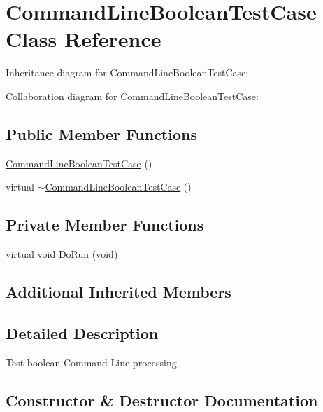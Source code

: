 \hypertarget{classCommandLineBooleanTestCase}{}\section{Command\+Line\+Boolean\+Test\+Case Class Reference}
\label{classCommandLineBooleanTestCase}


Inheritance diagram for Command\+Line\+Boolean\+Test\+Case\+:


Collaboration diagram for Command\+Line\+Boolean\+Test\+Case\+:
\subsection*{Public Member Functions}
\begin{DoxyCompactItemize}
\item 
\hyperlink{classCommandLineBooleanTestCase_a26faa2c5ddf24a34033c581c8ab4af52}{Command\+Line\+Boolean\+Test\+Case} ()
\item 
virtual \hyperlink{classCommandLineBooleanTestCase_a6fa662f6644dce140653383eb4a3a934}{$\sim$\+Command\+Line\+Boolean\+Test\+Case} ()
\end{DoxyCompactItemize}
\subsection*{Private Member Functions}
\begin{DoxyCompactItemize}
\item 
virtual void \hyperlink{classCommandLineBooleanTestCase_a363366e3ebe9d0e64d13911508866f29}{Do\+Run} (void)
\end{DoxyCompactItemize}
\subsection*{Additional Inherited Members}


\subsection{Detailed Description}
Test boolean Command Line processing 

\subsection{Constructor \& Destructor Documentation}
